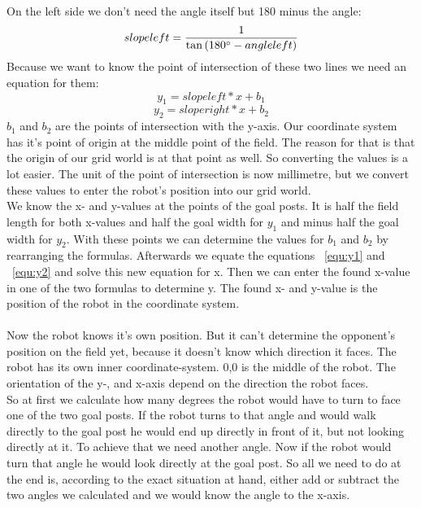 \documentclass[lnicst,a4paper]{svmultln}
\begin{document}
On the left side we don't need the angle itself but 180 minus the angle:
\begin{equation}
	slopeleft = \frac{1}{\tan{(180\degree - angleleft)}}
	\label{equ:slopeleft}
\end{equation}
Because we want to know the point of intersection of these two lines we need an equation for them:
\begin{equation}
	y_{1} = slopeleft * x + b_{1}
	\label{equ:y1}
\end{equation}
\begin{equation}
	y_{2} = sloperight * x + b_{2}
	\label{equ:y2}
\end{equation}
\(b_{1}\) and \(b_{2}\) are the points of intersection with the y-axis. Our coordinate system has it's point of origin at the middle point of the field. The reason for that is that the origin of our grid world is at that point as well. So converting the values is a lot easier. The unit of the point of intersection is now millimetre, but we convert these values to enter the robot's position into our grid world. 
\\
We know the x- and y-values at the points of the goal posts. It is half the field length for both x-values and half the goal width for \(y_{1}\) and minus half the goal width for \(y_{2}\). With these points we can determine the values for \(b_{1}\) and \(b_{2}\) by rearranging the formulas. Afterwards we equate the equations ~\ref{equ:y1} and ~\ref{equ:y2} and solve this new equation for x. Then we can enter the found x-value in one of the two formulas to determine y. The found x- and y-value is the position of the robot in the coordinate system.
\\
\\
Now the robot knows it's own position. But it can't determine the opponent's position on the field yet, because it doesn't know which direction it faces. The robot has its own inner coordinate-system. 0,0 is the middle of the robot. The orientation of the y-, and x-axis depend on the direction the robot faces.\\
So at first we calculate how many degrees the robot would have to turn to face one of the two goal posts. If the robot turns to that angle and would walk directly to the goal post he would end up directly in front of it, but not looking directly at it. To achieve that we need another angle. Now if the robot would turn that angle he would look directly at the goal post. So all we need to do at the end is, according to the exact situation at hand, either add or subtract the two angles we calculated and we would know the angle to the x-axis.
\end{document}
